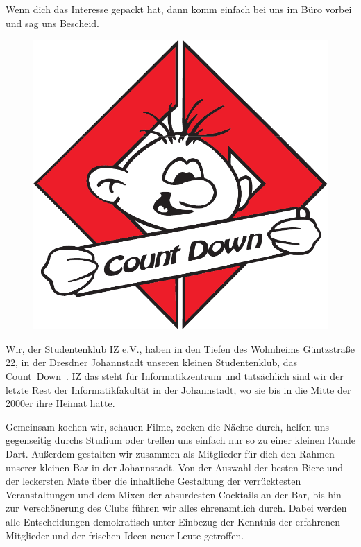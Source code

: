 Wenn dich das Interesse gepackt hat, dann komm einfach bei uns im Büro vorbei und sag uns Bescheid.


\begin{figure}%
  \vspace{-.5cm}
  \includegraphics[width=\linewidth]{img/countdown}
  \vspace{-1cm}
\end{figure}

Wir, der Studentenklub IZ e.V., haben in den Tiefen des Wohnheims Güntzstraße 22, in der Dresdner Johannstadt unseren kleinen Studentenklub, das Count~Down~.
IZ das steht für Informatikzentrum und tatsächlich sind wir der letzte Rest der Informatikfakultät in der Johannstadt, wo sie bis in die Mitte der 2000er ihre Heimat hatte.

Gemeinsam kochen wir, schauen Filme, zocken die Nächte durch, helfen uns gegenseitig durchs Studium oder treffen uns einfach nur so zu einer kleinen Runde Dart.
Außerdem gestalten wir zusammen als Mitglieder für dich den Rahmen unserer kleinen Bar in der Johannstadt.
Von der Auswahl der besten Biere und der leckersten Mate über die inhaltliche Gestaltung der verrücktesten Veranstaltungen und dem Mixen der absurdesten Cocktails an der Bar, bis hin zur Verschönerung des Clubs führen wir alles ehrenamtlich durch.
Dabei werden alle Entscheidungen demokratisch unter Einbezug der Kenntnis der erfahrenen Mitglieder und der frischen Ideen neuer Leute getroffen.

